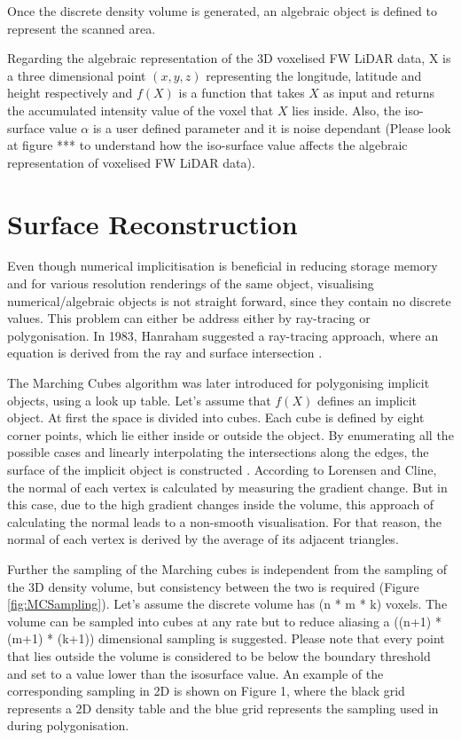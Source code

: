 \documentclass{subfiles}
\begin{document}
\par Once the discrete density volume is generated, an algebraic object is defined to represent the scanned area. 

\par Regarding the algebraic representation of the 3D voxelised FW LiDAR data, X is a three dimensional point $\mathit{(x, y, z) }$ representing the longitude, latitude and height respectively and ${f(X)}$ is a function that takes  $\mathit{X}$ as input and returns the accumulated intensity value of the voxel that  $\mathit{X}$ lies inside. Also, the iso-surface value $\mathit{\alpha }$ is a user defined parameter and it is noise dependant (Please look at figure *** to understand how the iso-surface value affects the algebraic representation of voxelised FW LiDAR data). 




\section {Surface Reconstruction}\label{sec:SurfaceReconstruction}
\par Even though numerical implicitisation is beneficial in reducing storage memory and for various resolution renderings of the same object, visualising numerical/algebraic objects is not straight forward, since they contain no discrete values. This problem can either be address either by ray-tracing or polygonisation. In 1983, Hanraham suggested a ray-tracing approach, where an equation is derived from the ray and surface intersection \cite{Hanrahan1983}.  

\par The Marching Cubes algorithm was later introduced for polygonising implicit objects, using a look up table. Let’s assume that $f(X)$ defines an implicit object. At first the space is divided into cubes. Each cube is defined by eight corner points, which lie either inside or outside the object. By enumerating all the possible cases and linearly interpolating the intersections along the edges, the surface of the implicit object is constructed \cite{Lorensen1987}. According to Lorensen and Cline, the normal of each vertex is calculated by measuring the gradient change. But in this case, due to the high gradient changes inside the volume, this approach of calculating the normal leads to a non-smooth visualisation. For that reason, the normal of each vertex is derived by the average of its adjacent triangles. 

\par Further the sampling of the Marching cubes is independent from the sampling of the 3D density volume, but consistency between the two is required (Figure \ref{fig:MCSampling}). Let’s assume the discrete volume has (n * m * k) voxels. The volume can be sampled into cubes at any rate but to reduce aliasing a ((n+1) *(m+1) * (k+1)) dimensional sampling is suggested. Please note that every point that lies outside the volume is considered to be below the boundary threshold and set to a value lower than the isosurface value. An example of the corresponding sampling in 2D is shown on Figure 1, where the black grid represents a 2D density table and the blue grid represents the sampling used in during polygonisation.
\end{document}

